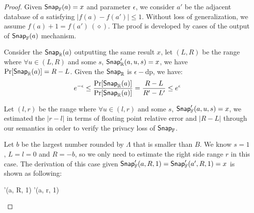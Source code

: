 \documentclass[a4paper,11pt]{article}
\begin{document}
\begin{proof}

Given $\mathsf{Snap}_{\mathbb{F}}(a) = x$ and parameter $\epsilon$, we consider $a'$ be the adjacent database of $a$ satisfying $|f(a) - f(a')| \leq 1$.
Without loss of generalization, we assume $f(a) + 1 = f(a') ~ (\diamond)$.
The proof is developed by cases of the output of $\mathsf{Snap}_{\mathbb{F}}(a)$ mechanism.
%

%
Consider the $\mathsf{Snap}_{\mathbb{R}}(a)$ outputting the same result $x$, let $(L, R)$ be the range where $\forall u \in (L, R)$ and some $s$, $\mathsf{Snap}_{\mathbb{R}}'(a, u, s) = x$, we have $\Pr[\mathsf{Snap}_{\mathbb{R}}(a)] = R - L$. Given the $\mathsf{Snap}_{\mathbb{R}}$ is $\epsilon-$dp, we have:
\[
	e^{-\epsilon} \leq \frac{\Pr[\mathsf{Snap}_{\mathbb{R}}(a)]}{\Pr[\mathsf{Snap}_{\mathbb{R}}(a)]} = \frac{R - L}{R' - L'} \leq e^{\epsilon}
\]
%

%
Let $(l, r)$ be the range where $\forall u \in (l, r)$ and some $s$, $\mathsf{Snap}_{\mathbb{F}}'(a, u, s) = x$, we estimated the $|r - l|$ in terms of floating point relative error and $|R - L|$ through our semantics in order to verify the privacy loss of $\mathsf{Snap}_{\mathbb{F}}$.
	\begin{itemize}
		Let $b$ be the largest number rounded by $\Lambda$ that is smaller than $B$.
		We know $s = 1$, $L = l = 0$ and $R = -b$, so we only need to estimate the right side range $r$ in this case. The derivation of this case given $\mathsf{Snap}_{\mathbb{F}}'(a, R, 1) = \mathsf{Snap}_{\mathbb{F}}'(a', R, 1) = x$ is shown as following:
		\begin{mathpar}
		{
			{
				{
					{
						\rsnap'(a, R, 1)
						\bigstep
						\fsnap'(a, r, 1)
}}}}
\end{mathpar}
\end{itemize}
\end{proof}
\end{document}
